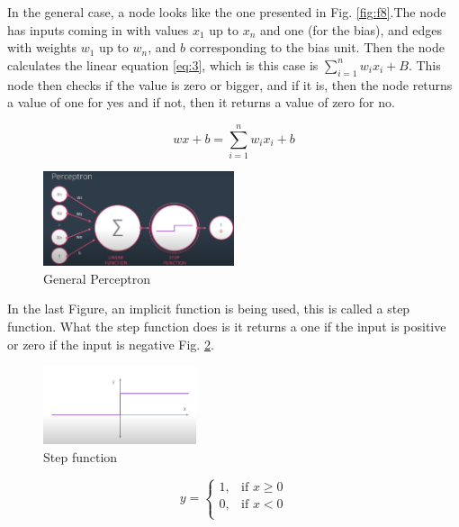 \documentclass{article}
\begin{document}
In the general case, a node looks like the one presented in Fig. \ref{fig:f8}.The node has inputs coming in with values \(x_1\) up to \(x_n\) and one (for the bias), and edges with weights \(w_1\) up to \(w_n\), and \(b\) corresponding to the bias unit. Then the node calculates the linear equation \eqref{eq:3}, which is this case is \(\sum_{i=1}^n w_i x_i + B\). This node then checks if the value is zero or bigger, and if it is, then the node returns a value of one for yes and if not, then it returns a value of zero for no. 

\[wx+b = \sum_{i=1}^n w_i x_i + b\]

\begin{figure}[ht]
    \centering
    \includegraphics[width=0.5\textwidth,height=0.5\textheight,keepaspectratio]{images/general_perceptron.PNG}
    \captionsetup{justification=centering}
    \caption{General Perceptron}
    \label{fig:8}
\end{figure}

In the last Figure, an implicit function is being used, this is called a step function. What the step function does is it returns a one if the input is positive or zero if the input is negative Fig. \ref{fig:f9}.

\begin{figure}[ht]
    \centering
    \includegraphics[width=0.4\textwidth,height=0.4\textheight,keepaspectratio]{images/step.PNG}
    \captionsetup{justification=centering}
    \caption{Step function}
    \label{fig:f9}
\end{figure}

\[
y =
  \begin{cases}
    1, & \text{if } x \geq 0 \\
    0, & \text{if } x < 0 \\
  \end{cases}
\]
\end{document}
